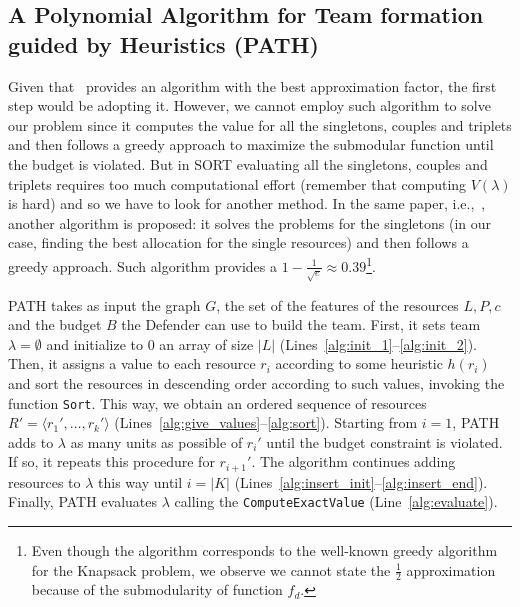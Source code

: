 \subsection{A Polynomial Algorithm for Team formation guided by Heuristics (PATH)}
Given that~\cite{khuller1999budgeted} provides an algorithm with the best approximation factor, the first step would be adopting it. However, we cannot employ such algorithm to solve our problem since it computes the value for all the singletons, couples and triplets and then follows a greedy approach to maximize the submodular function until the budget is violated. But in SORT evaluating all the singletons, couples and triplets requires too much computational effort (remember that computing $V(\lambda)$ is hard) and so we have to look for another method. In the same paper, i.e.,~\cite{khuller1999budgeted}, another algorithm is proposed: it solves the problems for the singletons (in our case, finding the best allocation for the single resources) and then follows a greedy approach. Such algorithm provides a $1-\frac{1}{\sqrt{e}} \approx 0.39$\footnote{Even though the algorithm corresponds to the well-known greedy algorithm for the Knapsack problem, we observe we cannot state the $\frac{1}{2}$ approximation because of the submodularity of function $f_d$.}.




PATH takes as input the graph $G$, the set of the features of the resources $L,P,c$ and the budget $B$ the Defender can use to build the team. First, it sets team $\lambda = \emptyset$ and initialize to $0$ an array of size $|L|$ (Lines~\ref{alg:init_1}--\ref{alg:init_2}). Then, it assigns a value to each resource $r_i$ according to some heuristic $h(r_i)$ and sort the resources in descending order according to such values, invoking the function \texttt{Sort}. This way, we obtain an ordered sequence of resources $ R' = \langle r_1', \ldots, r_k'\rangle$ (Lines~\ref{alg:give_values}--\ref{alg:sort}).  Starting from $i=1$, PATH adds to $\lambda$ as many units as possible of $r_i'$ until the budget constraint is violated. If so, it repeats this procedure for $r_{i+1}'$. The algorithm continues adding resources to $\lambda$ this way until $i=|K|$ (Lines~\ref{alg:insert_init}--\ref{alg:insert_end}). Finally, PATH evaluates $\lambda$ calling the \texttt{ComputeExactValue} (Line~\ref{alg:evaluate}).

